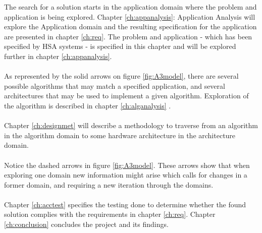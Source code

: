 The search for a solution starts in the application domain where the problem and application is being explored. Chapter \vref{ch:appanalysis}: Application Analysis will explore the Application domain and the resulting specification for the application are presented in chapter \vref{ch:req}. The problem and application - which has been specified by HSA systems - is specified in this chapter and will be explored further in chapter \vref{ch:appanalysis}.\\~\\
As represented by the solid arrows on figure \vref{fig:A3model}, there are several possible algorithms that may match a specified application, and several architectures that may be used to implement a given algorithm. Exploration of the algorithm is described in chapter \vref{ch:alganalysis} .\\~\\
Chapter \vref{ch:designmet} will describe a methodology to traverse from an algorithm in the algorithm domain to some hardware architecture in the architecture domain.\\~\\
Notice the dashed arrows in figure \vref{fig:A3model}. These arrows show that when exploring one domain new information might arise which calls for changes in a former domain, and requiring a new iteration through the domains.\\~\\

Chapter \vref{ch:acctest} specifies the testing done to determine whether the found solution complies with the requirements in chapter \vref{ch:req}. Chapter \vref{ch:conclusion} concludes the project and its findings. 


